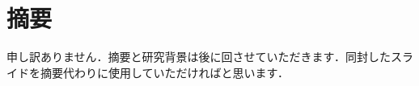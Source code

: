 \chapter*{摘要}
\label{chapter:Abstract}
申し訳ありません．摘要と研究背景は後に回させていただきます．同封したスライドを摘要代わりに使用していただければと思います．

